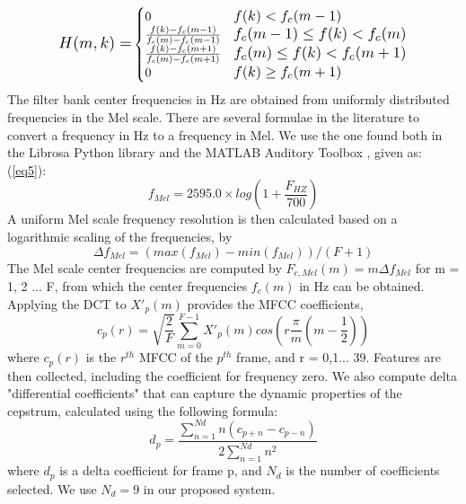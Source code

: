 \documentclass{ieeeaccess}
\begin{document}
\begin{equation}
\resizebox{0.17\hsize}{!}{$H(m,k)=$}
\begin{cases}
0                                           &  \resizebox{0.25\hsize}{!}{$f(k)< f_{c}(m-1)$} \\ 
\frac{f(k)-f_{c}(m-1)}{f_{c}(m)-f_{c}(m-1)} &  \resizebox{0.4\hsize}{!}{$f_{c}(m-1) \leq f(k)< f_{c}(m)$}\\ 
\frac{f(k)-f_{c}(m+1)}{f_{c}(m)-f_{c}(m+1)} &  \resizebox{0.4\hsize}{!}{$f_{c}(m) \leq f(k)< f_{c}(m+1)$}\\ 
0                                           &  \resizebox{0.25\hsize}{!}{$f(k)\geq f_{c}(m+1)$} 
\end{cases}
\label{eq4}
\end{equation}
The filter bank center frequencies in Hz are obtained from uniformly distributed frequencies in the Mel scale. There are several formulae in the literature to convert a frequency in Hz to a frequency in Mel. We use the one found both in the Librosa Python library \cite{27} and the MATLAB Auditory Toolbox \cite{28}, given as:(\ref{eq5}):
\begin{equation}
f_{Mel}=2595.0 \times log\left ( 1+\frac{F_{HZ}}{700} \right )
\label{eq5}
\end{equation}
A uniform Mel scale frequency resolution is then calculated based on a logarithmic scaling of the frequencies, by
\begin{equation}
\Delta f_{Mel}=(max(f_{Mel})-min(f_{Mel}))/(F+1)
\label{eq6}
\end{equation}
The Mel scale center frequencies are computed by $ F_{c,Mel}(m)=m\Delta f_{Mel} $ for m = 1, 2 ... F, from which the center frequencies $f_{c}(m) $  in Hz can be obtained. Applying the DCT to  $ {X}'_{p}(m) $ provides the MFCC coefficients,
\begin{equation}
c_{p}(r)=\sqrt {\frac{2}{F}}\sum_{m=0}^{F-1} {X}'_{p}(m)cos(r\frac{\pi}{m}(m-\frac{1}{2}))
\label{eq7}
\end{equation}
where  $c_{p}(r)$  is the $r^{th}$ MFCC of the $p^{th}$ frame, and r = 0,1... 39. Features are then collected, including the coefficient for frequency zero. We also compute delta "differential coefficients" that can capture the dynamic properties of the cepstrum, calculated using the following formula:
\begin{equation}
d_{p}=\frac{\sum_{n=1}^{Nd}n(c_{p+n}-c_{p-n})}{2\sum_{n=1}^{Nd}n^{2}}
\label{eq8}
\end{equation}
where $d_{p}$  is a delta coefficient for frame p, and $N_{d}$  is the number of coefficients selected. We use $N_{d}=9$   in our proposed system.
\end{document}
